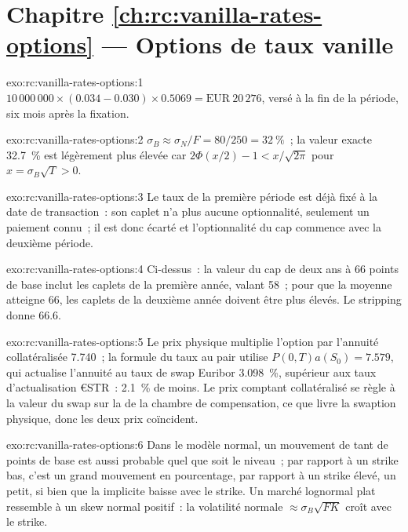 \section*{Chapitre \ref{ch:rc:vanilla-rates-options} --- Options de taux vanille}

\begin{solution}{exo:rc:vanilla-rates-options:1}
$10\,000\,000\times(0.034-0.030)\times0.5069 = \text{EUR}~20\,276$, versé à la
fin de la période, six mois après la fixation.
\end{solution}

\begin{solution}{exo:rc:vanilla-rates-options:2}
$\sigma_B\approx\sigma_N/F = 80/250 = 32~\%$~; la valeur exacte 32.7~\% est légèrement
plus élevée car $2\Phi(x/2)-1 < x/\sqrt{2\pi}$ pour $x = \sigma_B\sqrt T > 0$.
\end{solution}

\begin{solution}{exo:rc:vanilla-rates-options:3}
Le taux de la première période est déjà fixé à la date de transaction~: son caplet n'a
plus aucune optionnalité, seulement un paiement connu~; il est donc écarté et l'optionnalité
du cap commence avec la deuxième période.
\end{solution}

\begin{solution}{exo:rc:vanilla-rates-options:4}
Ci-dessus~: la valeur du cap de deux ans à 66 points de base inclut les caplets de la
première année, valant 58~; pour que la moyenne atteigne 66, les caplets de la deuxième
année doivent être plus élevés. Le stripping donne 66.6.
\end{solution}

\begin{solution}{exo:rc:vanilla-rates-options:5}
Le prix physique multiplie l'option par l'annuité collatéralisée 7.740~;
la formule du taux au pair utilise $P(0,T)a(S_0) = 7.579$, qui actualise
l'annuité au taux de swap Euribor 3.098~\%, supérieur aux taux d'actualisation €STR~:
2.1~\% de moins. Le prix comptant collatéralisé se règle à la valeur du swap sur la
 de la chambre de compensation, ce que livre la swaption physique,
donc les deux prix coïncident.
\end{solution}

\begin{solution}{exo:rc:vanilla-rates-options:6}
Dans le modèle normal, un mouvement de tant de points de base est aussi probable quel que
soit le niveau~; par rapport à un strike bas, c'est un grand mouvement en pourcentage, par rapport à un
strike élevé, un petit, si bien que la  implicite baisse avec le
strike. Un marché lognormal plat ressemble à un skew normal positif~: la volatilité normale
$\approx\sigma_B\sqrt{FK}$ croît avec le strike.
\end{solution}

